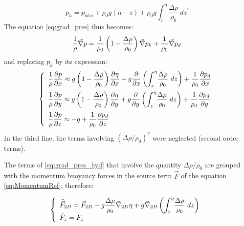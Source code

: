 \begin{equation}
p_h=p_{atm}+\rho_{0}g\left(  \eta-z\right)  +\rho_{0}g\int\nolimits_{z}^{\eta%
}\dfrac{\Delta\rho}{\rho_{0}}~dz^{\prime} \label{valeurdep}%
\end{equation}
The equation \eqref{eq:grad_pres} thus becomes:
\begin{equation}
  \dfrac{1}{\rho}\vec \nabla p  = \dfrac{1}{\rho_0}\left(1-\dfrac{\Delta\rho}{\rho_0}\right)\vec \nabla p_h + \dfrac{1}{\rho_0}\vec \nabla p_d
\end{equation}
and replacing $p_h$ by its expression:
\begin{equation}
\left\{\begin{array}{l}
\dfrac{1}{\rho}\dfrac{\partial p}{\partial x} \approx g\left(1 - \dfrac{\Delta \rho}{\rho_0}\right)\dfrac{\partial \eta}{\partial x}
+ g\dfrac{\partial}{\partial x} \left(\displaystyle{\int_z^\eta}\dfrac{\Delta\rho}{\rho_0}~dz\right)+ \dfrac{1}{\rho_0}\dfrac{\partial p_d}{\partial x}\medskip \\
\dfrac{1}{\rho}\dfrac{\partial p}{\partial y} \approx g\left(1 - \dfrac{\Delta \rho}{\rho_0}\right)\dfrac{\partial \eta}{\partial y}
+ g\dfrac{\partial}{\partial y} \left(\displaystyle{\int_z^\eta}\dfrac{\Delta\rho}{\rho_0}~dz\right)+ \dfrac{1}{\rho_0}\dfrac{\partial p_d}{\partial y}\medskip \\
\dfrac{1}{\rho}\dfrac{\partial p}{\partial z} \approx - g + \dfrac{1}{\rho_0}\dfrac{\partial p_d}{\partial z}\\
\end{array}\right.
  \label{eq:grad_pres_hyd}
\end{equation}
In the third line, the terms involving $\left(\Delta \rho/\rho_0\right)^2$ were neglected (second order terms).

The terms of \eqref{eq:grad_pres_hyd} that involve the quantity $\Delta\rho/\rho_0$
are grouped with the momentum buoyancy forces in the source term $\vec{F}$ of the equation \eqref{eq:MomentumRef}; therefore:

\begin{equation}\left\{\begin{array}{l}
  \tilde{\vec{F}}_{2D} = \vec{F}_{2D}
  - g\dfrac{\Delta\rho}{\rho_0}\vec \nabla_{2D}\eta
  + g\vec \nabla_{2D}\left(\displaystyle{\int_z^\eta}\dfrac{\Delta\rho}{\rho_0}~dz\right) \\
    \tilde{F}_{z} = F_{z}\end{array}\right.
  \label{eq:buoyancyTerms}
\end{equation}

